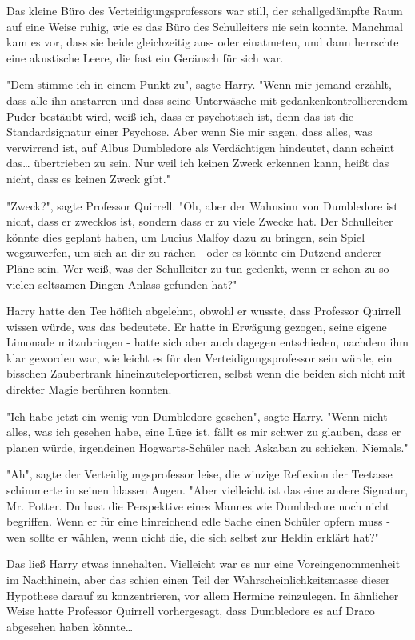 {Das kleine Büro des Verteidigungsprofessors war still, der schallgedämpfte Raum auf eine Weise ruhig, wie es das Büro des Schulleiters nie sein konnte. Manchmal kam es vor, dass sie beide gleichzeitig aus- oder einatmeten, und dann herrschte eine akustische Leere, die fast ein Geräusch für sich war.

"Dem stimme ich in einem Punkt zu", sagte Harry. "Wenn mir jemand erzählt, dass alle ihn anstarren und dass seine Unterwäsche mit gedankenkontrollierendem Puder bestäubt wird, weiß ich, dass er psychotisch ist, denn das ist die Standardsignatur einer Psychose. Aber wenn Sie mir sagen, dass alles, was verwirrend ist, auf Albus Dumbledore als Verdächtigen hindeutet, dann scheint das… übertrieben zu sein. Nur weil ich keinen Zweck erkennen kann, heißt das nicht, dass es keinen Zweck gibt."

"Zweck?", sagte Professor Quirrell. "Oh, aber der Wahnsinn von Dumbledore ist nicht, dass er zwecklos ist, sondern dass er zu viele Zwecke hat. Der Schulleiter könnte dies geplant haben, um Lucius Malfoy dazu zu bringen, sein Spiel wegzuwerfen, um sich an dir zu rächen - oder es könnte ein Dutzend anderer Pläne sein. Wer weiß, was der Schulleiter zu tun gedenkt, wenn er schon zu so vielen seltsamen Dingen Anlass gefunden hat?"

Harry hatte den Tee höflich abgelehnt, obwohl er wusste, dass Professor Quirrell wissen würde, was das bedeutete. Er hatte in Erwägung gezogen, seine eigene Limonade mitzubringen - hatte sich aber auch dagegen entschieden, nachdem ihm klar geworden war, wie leicht es für den Verteidigungsprofessor sein würde, ein bisschen Zaubertrank hineinzuteleportieren, selbst wenn die beiden sich nicht mit direkter Magie berühren konnten.

"Ich habe jetzt ein wenig von Dumbledore gesehen", sagte Harry. "Wenn nicht alles, was ich gesehen habe, eine Lüge ist, fällt es mir schwer zu glauben, dass er planen würde, irgendeinen Hogwarts-Schüler nach Askaban zu schicken. Niemals."

"Ah", sagte der Verteidigungsprofessor leise, die winzige Reflexion der Teetasse schimmerte in seinen blassen Augen. "Aber vielleicht ist das eine andere Signatur, Mr. Potter. Du hast die Perspektive eines Mannes wie Dumbledore noch nicht begriffen. Wenn er für eine hinreichend edle Sache einen Schüler opfern muss - wen sollte er wählen, wenn nicht die, die sich selbst zur Heldin erklärt hat?"

Das ließ Harry etwas innehalten. Vielleicht war es nur eine Voreingenommenheit im Nachhinein, aber das schien einen Teil der Wahrscheinlichkeitsmasse dieser Hypothese darauf zu konzentrieren, vor allem Hermine reinzulegen. In ähnlicher Weise hatte Professor Quirrell vorhergesagt, dass Dumbledore es auf Draco abgesehen haben könnte…

}
